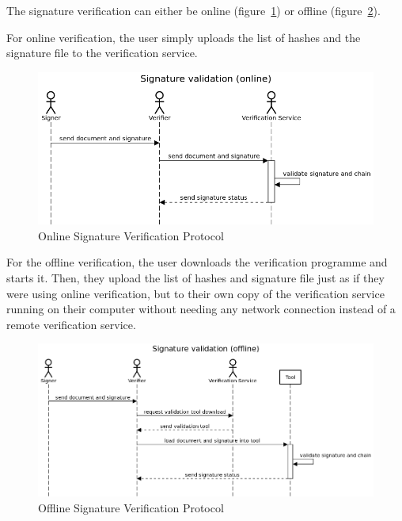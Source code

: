 The signature verification can either be online (figure~\ref{fig:onlinesignatureverificationprotocol})
or offline (figure~\ref{fig:offlinesignatureverificationprotocol}).

For online verification, the user simply uploads the list of hashes and the signature file to the verification service.

\begin{figure}
	\begin{center}
		\includegraphics[scale=0.5]{images/protocol_online_verification_high_level.png}
		\caption{Online Signature Verification Protocol}
		\label{fig:onlinesignatureverificationprotocol}
	\end{center}
\end{figure}

For the offline verification, the user downloads the verification programme and starts it.
Then, they upload the list of hashes and signature file just as if they were using online verification,
but to their own copy of the verification service running on their computer without needing any network connection
instead of a remote verification service.

\begin{figure}
	\begin{center}
		\includegraphics[scale=0.5]{images/protocol_offline_verification_high_level.png}
		\caption{Offline Signature Verification Protocol}
		\label{fig:offlinesignatureverificationprotocol}
	\end{center}
\end{figure}

